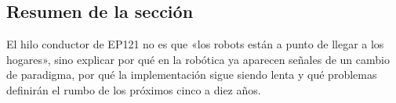 \subsection{Resumen de la sección}

El hilo conductor de EP121 no es que «los robots están a punto de llegar a los hogares», sino explicar por qué en la robótica ya aparecen señales de un cambio de paradigma, por qué la implementación sigue siendo lenta y qué problemas definirán el rumbo de los próximos cinco a diez años.

